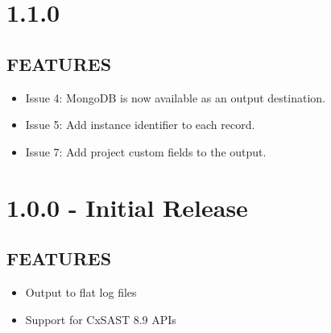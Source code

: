 \section{1.1.0}
\subsection*{FEATURES}
    \begin{itemize}
        \item Issue 4: MongoDB is now available as an output destination.
        \item Issue 5: Add instance identifier to each record.
        \item Issue 7: Add project custom fields to the output.
    \end{itemize}

\section{1.0.0 - Initial Release}
\subsection*{FEATURES}
    \begin{itemize}
        \item Output to flat log files
        \item Support for CxSAST 8.9 APIs
    \end{itemize}
